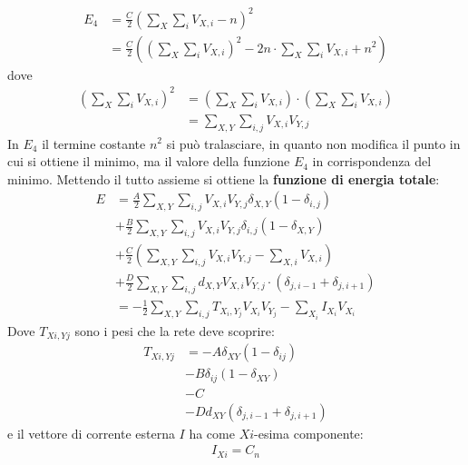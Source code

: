\begin{align*}
    E_4 &= \frac{C}{2}\left(\sum_X \sum_i V_{X,i} - n \right)^2 \\
	&= \frac{C}{2} \left(\left(\sum_X \sum_i V_{X,i}\right)^2 - 2n \cdot \sum_X \sum_i V_{X,i} + n^2 \right)
\end{align*}
dove
\begin{align*}
	\left(\sum_X \sum_i V_{X,i}\right)^2 &= \left(\sum_X \sum_i V_{X,i}\right) \cdot \left(\sum_X \sum_i V_{X,i} \right) \\
	&= \sum_{X,Y} \sum_{i,j} V_{X,i} V_{Y,j}
\end{align*}
In $E_4$ il termine costante $n^2$ si può tralasciare, in quanto non modifica il punto in cui si ottiene il minimo, ma il valore della funzione $E_4$ in corrispondenza del minimo.
Mettendo il tutto assieme si ottiene la \textbf{funzione di energia totale}:
\begin{align*}
	E &= \frac{A}{2} \sum_{X,Y} \sum_{i,j} V_{X,i} V_{Y,j} \delta_{X,Y} (1 - \delta_{i,j}) \\
	&+ \frac{B}{2} \sum_{X,Y} \sum_{i,j} V_{X,i} V_{Y,j} \delta_{i,j} (1 - \delta_{X,Y}) \\
	&+ \frac{C}{2} \left(\sum_{X,Y} \sum_{i,j} V_{X,i} V_{Y,j} - \sum_{X,i} V_{X,i} \right) \\
	&+ \frac{D}{2} \sum_{X,Y} \sum_{i,j} d_{X,Y} V_{X,i} V_{Y,j} \cdot (\delta_{j, i-1} + \delta_{j, i+1}) \\
	&= - \frac{1}{2} \sum_{X, Y} \sum_{i, j} T_{X_i, Y_j} V_{X_i} V_{Y_j} - \sum_{X_i} I_{X_i} V_{X_i}
\end{align*}
Dove $T_{Xi, Yj}$ sono i pesi che la rete deve scoprire:
\begin{align*}
	T_{Xi, Yj} &= - A \delta_{XY} (1 - \delta_{ij}) \tag{peso inibitorio in ogni riga}\\
	& - B \delta_{ij} (1 - \delta_{XY}) \tag{peso inibitorio in ogni colonna} \\
	& - C  \qquad \tag{Inibizione globale}\\
	& - D d_{XY} (\delta_{j,i-1} + \delta_{j, i+1}) \tag{Termine dei dati}
\end{align*}
e il vettore di corrente esterna $I$ ha come $Xi$-esima componente:
\begin{align*}
	I_{Xi} = C_n \tag{Corrente esterna eccitatoria}
\end{align*}

\newpage

